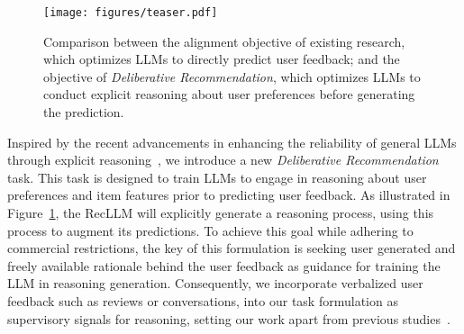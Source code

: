\begin{figure}[tbp]
\setlength{\abovecaptionskip}{0cm}
\setlength{\belowcaptionskip}{-0.3cm}
  \centering
  \texttt{[image: figures/teaser.pdf]}
  \caption{Comparison between the alignment objective of existing research, which optimizes LLMs to directly predict user feedback; and the objective of \textit{Deliberative Recommendation}, which optimizes LLMs to conduct explicit reasoning about user preferences before generating the prediction.}
  \label{fig:teaser}
\end{figure}

Inspired by the recent advancements in enhancing the reliability of general LLMs through explicit reasoning~\cite{cheng2025think,math1,math2,math3,logic1}, we introduce a new \textit{Deliberative Recommendation} task. This task is designed to train LLMs to engage in reasoning about user preferences and item features prior to predicting user feedback. As illustrated in Figure~\ref{fig:teaser}, the RecLLM will explicitly generate a reasoning process, using this process to augment its predictions. To achieve this goal while adhering to commercial restrictions, the key of this formulation is seeking user generated and freely available rationale behind the user feedback as guidance for training the LLM in reasoning generation. Consequently, we incorporate verbalized user feedback such as reviews or conversations, into our task formulation as supervisory signals for reasoning, setting our work apart from previous studies~\cite{ACL_findings,expert,GOT4Rec}. 

